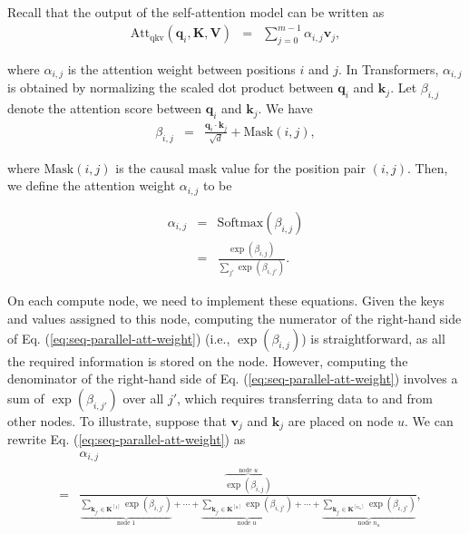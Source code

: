 Recall that the output of the self-attention model can be written as
\begin{eqnarray}
\mathrm{Att}_{\mathrm{qkv}}(\mathbf{q}_i,\mathbf{K},\mathbf{V}) & = & \sum_{j=0}^{m-1} \alpha_{i,j} \mathbf{v}_j \label{eq:seq-parallel-qkv},
\end{eqnarray}

\noindent where $\alpha_{i,j}$ is the attention weight between positions $i$ and $j$. In Transformers, $\alpha_{i,j}$ is obtained by normalizing the scaled dot product between $\mathbf{q}_i$ and $\mathbf{k}_j$. Let $\beta_{i,j}$ denote the attention score between $\mathbf{q}_i$ and $\mathbf{k}_j$. We have
\begin{eqnarray}
\beta_{i,j} & = & \frac{\mathbf{q}_i \cdot \mathbf{k}_j}{\sqrt{d}}  + \mathrm{Mask}(i,j),
\end{eqnarray}

\noindent where $\mathrm{Mask}(i,j)$ is the causal mask value for the position pair $(i,j)$. Then, we define the attention weight $\alpha_{i,j}$ to be

\begin{eqnarray}
\alpha_{i,j} & = & \mathrm{Softmax}(\beta_{i,j}) \nonumber \\
             & = & \frac{\exp(\beta_{i,j})}{\sum_{j'} \exp(\beta_{i,j'})} \label{eq:seq-parallel-att-weight}.
\end{eqnarray}

On each compute node, we need to implement these equations. Given the keys and values assigned to this node, computing the numerator of the right-hand side of Eq. (\ref{eq:seq-parallel-att-weight}) (i.e., $\exp(\beta_{i,j})$) is straightforward, as all the required information is stored on the node. However, computing the denominator of the right-hand side of Eq. (\ref{eq:seq-parallel-att-weight}) involves a sum of $\exp(\beta_{i,j'})$ over all $j'$, which requires transferring data to and from other nodes. To illustrate, suppose that $\mathbf{v}_j$ and $\mathbf{k}_j$ are placed on node $u$. We can rewrite Eq. (\ref{eq:seq-parallel-att-weight}) as
\begin{eqnarray}
&   & \alpha_{i,j} \nonumber \\
& = & \frac{\overbrace{\exp(\beta_{i,j})}^{\textrm{node $u$}}}{\underbrace{\sum_{\mathbf{k}_{j'} \in \mathbf{K}^{[1]}} \exp(\beta_{i,j'}) }_{\textrm{node $1$}} + \cdots + \underbrace{\sum_{\mathbf{k}_{j'} \in \mathbf{K}^{[u]}} \exp(\beta_{i,j'}) }_{\textrm{node $u$}} + \cdots + \underbrace{\sum_{\mathbf{k}_{j'} \in \mathbf{K}^{[n_u]}} \exp(\beta_{i,j'}) }_{\textrm{node $n_u$}} } \label{eq:seq-parallel-att-weight-distributed},
\end{eqnarray}

